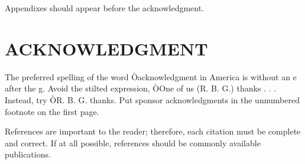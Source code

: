 \documentclass[letterpaper, 10 pt, conference]{ieeeconf}  %
\begin{document}
	Appendixes should appear before the acknowledgment.
	
	\section*{ACKNOWLEDGMENT}
	
	The preferred spelling of the word Òacknowledgment in America is without an e after the g. Avoid the stilted expression, ÒOne of us (R. B. G.) thanks . . .  Instead, try ÒR. B. G. thanks. Put sponsor acknowledgments in the unnumbered footnote on the first page.
	
	
	
	
	References are important to the reader; therefore, each citation must be complete and correct. If at all possible, references should be commonly available publications.
	
	
	
\end{document}
